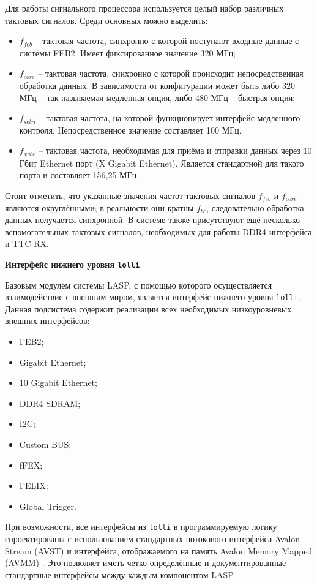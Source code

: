Для работы сигнального процессора используется целый набор различных тактовых сигналов. Среди основных можно выделить:
\begin{itemize}
    \item $f_{feb}$ -- тактовая частота, синхронно с которой поступают входные данные с системы FEB2. Имеет фиксированное значение 320 МГц;
    \item $f_{core}$ --  тактовая частота, синхронно с которой происходит непосредственная обработка данных. В зависимости от конфигурации может быть либо 320 МГц -- так называемая медленная опция, либо 480 МГц -- быстрая опция;
    \item $f_{sctrl}$ -- тактовая частота, на которой функционирует интерфейс медленного контроля. Непосредственное значение составляет 100 МГц.
    \item $f_{xgbe}$ -- тактовая частота, необходимая для приёма и отправки данных через 10 Гбит Ethernet порт (X Gigabit Ethernet). Является стандартной для такого порта и составляет 156,25 МГц.
\end{itemize}\par
Стоит отметить, что указанные значения частот тактовых сигналов $f_{feb}$ и $f_{core}$ являются округлёнными; в реальности они кратны $f_{bc}$, следовательно обработка данных получается синхронной. В системе также присутствуют ещё несколько вспомогательных тактовых сигналов, необходимых для работы DDR4 интерфейса и TTC RX.\par
\textbf{Интерфейс нижнего уровня \texttt{lolli}}\par
Базовым модулем системы LASP, с помощью которого осуществляется взаимодействие с внешним миром, является интерфейс нижнего уровня \texttt{lolli}. Данная подсистема содержит реализации всех необходимых низкоуровневых внешних интерфейсов:\par
\begin{itemize}
    \item FEB2;
    \item Gigabit Ethernet;
    \item 10 Gigabit Ethernet;
    \item DDR4 SDRAM;
    \item I2C;
    \item Custom BUS;
    \item fFEX;
    \item FELIX;
    \item Global Trigger.
\end{itemize}\par
При возможности, все интерфейсы из \texttt{lolli} в программируемую логику спроектированы с использованием стандартных потокового интерфейса Avalon Stream (AVST) \parencite{avalon} и интерфейса, отображаемого на память Avalon Memory Mapped (AVMM) \parencite{avalon}. Это позволяет иметь четко определённые и документированные стандартные интерфейсы между каждым компонентом LASP.\par
